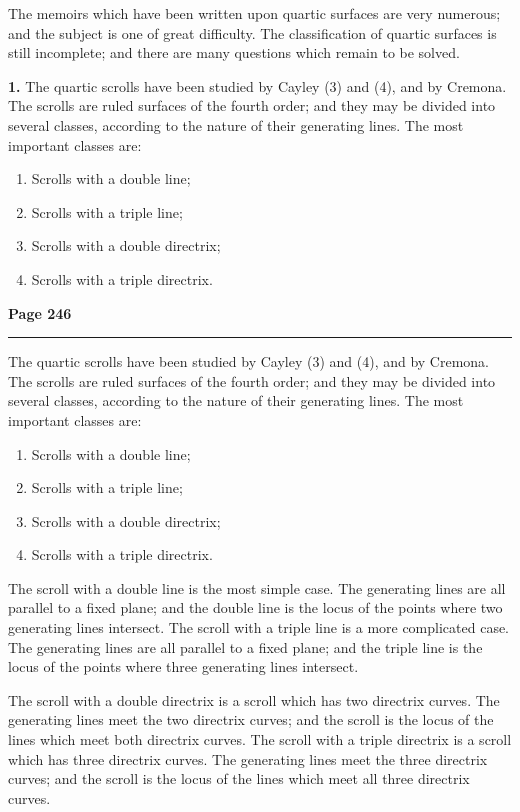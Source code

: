 \documentclass[12pt,a4paper]{article}
\theoremstyle{plain}
\theoremstyle{definition}
\theoremstyle{remark}
\begin{document}
\noindent The memoirs which have been written upon quartic surfaces are very numerous; and the subject is one of great difficulty. The classification of quartic surfaces is still incomplete; and there are many questions which remain to be solved.

\bigskip

\noindent\textbf{1.} The quartic scrolls have been studied by Cayley (3) and (4), and by Cremona. The scrolls are ruled surfaces of the fourth order; and they may be divided into several classes, according to the nature of their generating lines. The most important classes are:

\begin{enumerate}
\item Scrolls with a double line;
\item Scrolls with a triple line;
\item Scrolls with a double directrix;
\item Scrolls with a triple directrix.
\end{enumerate}

\newpage
\noindent\textbf{Page 246}\\
\noindent\rule{\textwidth}{0.4pt}

\smallskip

\noindent The quartic scrolls have been studied by Cayley (3) and (4), and by Cremona. The scrolls are ruled surfaces of the fourth order; and they may be divided into several classes, according to the nature of their generating lines. The most important classes are:

\begin{enumerate}
\item Scrolls with a double line;
\item Scrolls with a triple line;
\item Scrolls with a double directrix;
\item Scrolls with a triple directrix.
\end{enumerate}

\noindent The scroll with a double line is the most simple case. The generating lines are all parallel to a fixed plane; and the double line is the locus of the points where two generating lines intersect. The scroll with a triple line is a more complicated case. The generating lines are all parallel to a fixed plane; and the triple line is the locus of the points where three generating lines intersect.

\noindent The scroll with a double directrix is a scroll which has two directrix curves. The generating lines meet the two directrix curves; and the scroll is the locus of the lines which meet both directrix curves. The scroll with a triple directrix is a scroll which has three directrix curves. The generating lines meet the three directrix curves; and the scroll is the locus of the lines which meet all three directrix curves.
\end{document}
